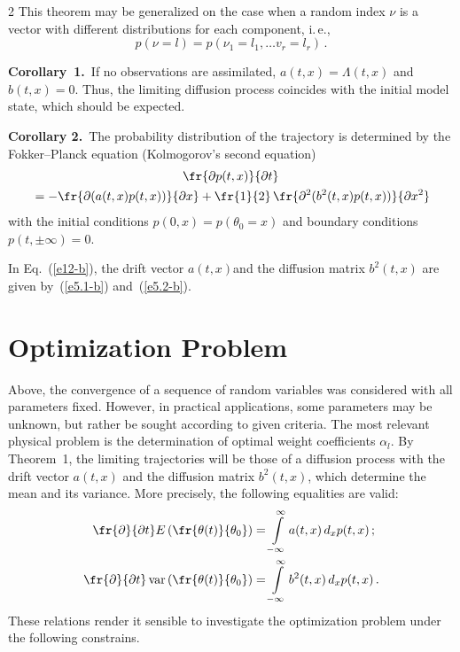 \begin{multicols}{2}
This theorem may be generalized on the case when a random index $\nu$ is a vector with 
different distributions for each component, i.\,e.,
$$
p(\nu =l)=p(\nu_{1} =l_{1} ,\ldots v_{r} =l_{r} )\,.
$$

\noindent 
\textbf{Corollary~1.}\ 
If no observations are assimilated, ${a(t,x)= \Lambda(t,x)} $ and $b(t,x)=0.$ 
Thus, the limiting diffusion process coincides with the initial model state, 
which should be expected.

\smallskip

\noindent 
\textbf{Corollary 2.}\ 
The probability distribution of the trajectory is determined by the Fokker--Planck 
equation (Kolmogorov's second equation)
\begin{multline}
\fr{\partial p(t,x)}{\partial t}\\
{} =-\fr{\partial (a(t,x)p(t,x))}{\partial x} +
\fr{1}{2}\,\fr{\partial ^{2} (b^{2} (t,x)p(t,x))}{\partial x^{2} }
\label{e12-b}
\end{multline}
with the initial conditions $p(0,x)=p(\theta_{0} =x)$ and boundary conditions 
$p(t,\pm \infty )=0$.

In Eq.~(\ref{e12-b}), the drift vector $a(t,x)$and the diffusion matrix $b^{2} (t,x)$ are given 
by~(\ref{e5.1-b}) and~(\ref{e5.2-b}).


\section{Optimization Problem}

\noindent
Above, the convergence of a sequence of random variables was considered with all 
parameters fixed. However, in practical applications, some parameters may  be 
unknown, but rather be sought according to given criteria. The most relevant physical 
problem is the determination of optimal weight coefficients $\alpha_{l} $. By Theorem~1, 
the limiting trajectories will be those of a diffusion process with the drift vector 
$a(t,x)$ and the diffusion matrix $b^{2} (t,x)$, which determine the mean and its variance. 
More precisely, the following equalities are valid:
\begin{align*}
\fr{\partial }{\partial t} E\left(\fr{\theta (t)}{\theta_{0}} \right)&=
\int\limits_{-\infty }^{\infty }a(t,x)\,d_{x} p(t,x)\,;
\\
\fr{\partial }{\partial t} \,\mathrm{var}\left(\fr{\theta (t)}{\theta_{0} }\right)&=
\int\limits_{-\infty }^{\infty }b^{2} (t,x)\,d_{x} p(t,x)\,.
\end{align*}
These relations render it sensible to investigate the optimization problem under the 
following constrains.


\end{multicols}
